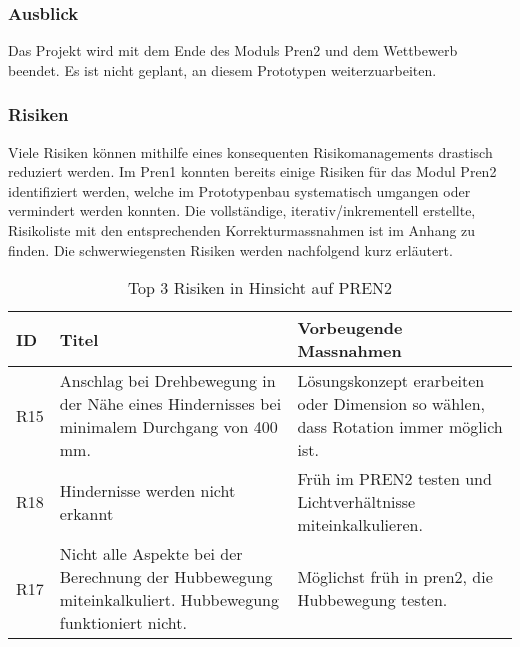 \subsubsection{Ausblick}

Das Projekt wird mit dem Ende des Moduls Pren2 und dem Wettbewerb beendet. Es ist nicht geplant, an diesem Prototypen weiterzuarbeiten.



\subsubsection{Risiken}

Viele Risiken können mithilfe eines konsequenten Risikomanagements drastisch reduziert werden. Im Pren1 konnten bereits einige Risiken für das Modul Pren2 identifiziert werden, welche im Prototypenbau systematisch umgangen oder vermindert werden konnten. Die vollständige, iterativ/inkrementell erstellte, Risikoliste mit den entsprechenden Korrekturmassnahmen ist im Anhang zu finden. Die schwerwiegensten Risiken werden nachfolgend kurz erläutert.

\begin{center}
\begin{table}[H]
    \begin{tabularx}{\textwidth}{|l|X|X|}
        \hline
        \textbf{ID} & \textbf{Titel} & \textbf{Vorbeugende Massnahmen} \\ \hline
        R15 & Anschlag bei Drehbewegung in der Nähe eines Hindernisses bei minimalem Durchgang von 400 mm. & Lösungskonzept erarbeiten oder Dimension so wählen, dass Rotation immer möglich ist. \\ \hline
        R18 & Hindernisse werden nicht erkannt & Früh im PREN2 testen und Lichtverhältnisse miteinkalkulieren. \\ \hline
        R17 & Nicht alle Aspekte bei der Berechnung der Hubbewegung miteinkalkuliert. Hubbewegung funktioniert nicht. & Möglichst früh in \acrshort{pren2}, die Hubbewegung testen.\\ \hline
    \end{tabularx}
    \caption{Top 3 Risiken in Hinsicht auf PREN2}
    \label{tab:risikomanagement-ausblick}
\end{table}
\end{center}










